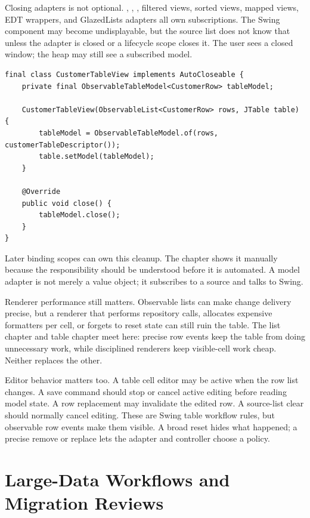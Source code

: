 Closing adapters is not optional. ,
, , filtered views,
sorted views, mapped views, EDT wrappers, and GlazedLists adapters all own
subscriptions. The Swing component may become undisplayable, but the source list
does not know that unless the adapter is closed or a lifecycle scope closes it.
The user sees a closed window; the heap may still see a subscribed model.

\begin{lstlisting}[caption={A screen closes the adapters it installs.}]
final class CustomerTableView implements AutoCloseable {
    private final ObservableTableModel<CustomerRow> tableModel;

    CustomerTableView(ObservableList<CustomerRow> rows, JTable table) {
        tableModel = ObservableTableModel.of(rows, customerTableDescriptor());
        table.setModel(tableModel);
    }

    @Override
    public void close() {
        tableModel.close();
    }
}
\end{lstlisting}

Later binding scopes can own this cleanup. The chapter shows it manually because
the responsibility should be understood before it is automated. A model adapter
is not merely a value object; it subscribes to a source and talks to Swing.

Renderer performance still matters. Observable lists can make change delivery
precise, but a renderer that performs repository calls, allocates expensive
formatters per cell, or forgets to reset state can still ruin the table. The
list chapter and table chapter meet here: precise row events keep the table from
doing unnecessary work, while disciplined renderers keep visible-cell work
cheap. Neither replaces the other.

Editor behavior matters too. A table cell editor may be active when the row list
changes. A save command should stop or cancel active editing before reading
model state. A row replacement may invalidate the edited row. A source-list
clear should normally cancel editing. These are Swing table workflow rules, but
observable row events make them visible. A broad reset hides what happened; a
precise remove or replace lets the adapter and controller choose a policy.

\section{Large-Data Workflows and Migration Reviews}

